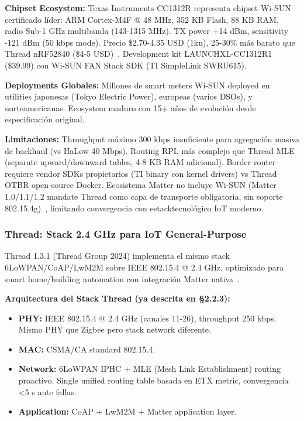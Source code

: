 \textbf{Chipset Ecosystem:} Texas Instruments CC1312R representa chipset Wi-SUN certificado líder: ARM Cortex-M4F @ 48 MHz, 352 KB Flash, 88 KB RAM, radio Sub-1 GHz multibanda (143-1315 MHz). TX power +14 dBm, sensitivity -121 dBm (50 kbps mode). Precio \$2.70-4.35 USD (1ku), 25-30\% más barato que Thread nRF52840 (\$4-5 USD)~\cite{tiCC1312RWiSUN2024}. Development kit LAUNCHXL-CC1312R1 (\$39.99) con Wi-SUN FAN Stack SDK (TI SimpleLink SWRU615).

\textbf{Deployments Globales:} Millones de smart meters Wi-SUN deployed en utilities japonesas (Tokyo Electric Power), europeas (varios DSOs), y norteamericanas. Ecosystem maduro con 15+ años de evolución desde especificación original.

\textbf{Limitaciones:} Throughput máximo 300 kbps insuficiente para agregación masiva de backhaul (vs HaLow 40 Mbps). Routing RPL más complejo que Thread MLE (separate upward/downward tables, 4-8 KB RAM adicional). Border router requiere vendor SDKs propietarios (TI binary con kernel drivers) vs Thread OTBR open-source Docker. Ecosistema Matter no incluye Wi-SUN (Matter 1.0/1.1/1.2 mandate Thread como capa de transporte obligatoria, sin soporte 802.15.4g)~\cite{threadMatterConvergence2024}, limitando convergencia con estacktecnológico IoT moderno.

\subsubsection{Thread: Stack 2.4 GHz para IoT General-Purpose}

Thread 1.3.1 (Thread Group 2024) implementa el mismo stack 6LoWPAN/CoAP/LwM2M sobre IEEE 802.15.4 @ 2.4 GHz, optimizado para smart home/building automation con integración Matter nativa~\cite{threadMatterConvergence2024}.

\textbf{Arquitectura del Stack Thread (ya descrita en §2.2.3):}
\begin{itemize}
    \item \textbf{PHY:} IEEE 802.15.4 @ 2.4 GHz (canales 11-26), throughput 250 kbps. Mismo PHY que Zigbee pero stack network diferente.
    \item \textbf{MAC:} CSMA/CA standard 802.15.4.
    \item \textbf{Network:} 6LoWPAN IPHC + MLE (Mesh Link Establishment) routing proactivo. Single unified routing table basada en ETX metric, convergencia <5 s ante fallas.
    \item \textbf{Application:} CoAP + LwM2M + Matter application layer.
\end{itemize}


